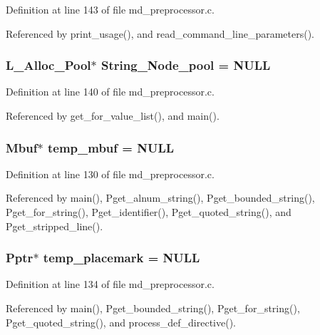 Definition at line 143 of file md\_\-preprocessor.c.

Referenced by print\_\-usage(), and read\_\-command\_\-line\_\-parameters().
\subsubsection{\setlength{\rightskip}{0pt plus 5cm}\bf{L\_\-Alloc\_\-Pool}$\ast$ \bf{String\_\-Node\_\-pool} = \bf{NULL}}\label{md__preprocessor_8c_d47ec2b1abf9cb9d0128bc3fc27d94c5}




Definition at line 140 of file md\_\-preprocessor.c.

Referenced by get\_\-for\_\-value\_\-list(), and main().
\subsubsection{\setlength{\rightskip}{0pt plus 5cm}\bf{Mbuf}$\ast$ \bf{temp\_\-mbuf} = \bf{NULL}}\label{md__preprocessor_8c_bcfb4b06283a7a8a72bf5c01c75b4e35}




Definition at line 130 of file md\_\-preprocessor.c.

Referenced by main(), Pget\_\-alnum\_\-string(), Pget\_\-bounded\_\-string(), Pget\_\-for\_\-string(), Pget\_\-identifier(), Pget\_\-quoted\_\-string(), and Pget\_\-stripped\_\-line().
\subsubsection{\setlength{\rightskip}{0pt plus 5cm}\bf{Pptr}$\ast$ \bf{temp\_\-placemark} = \bf{NULL}}\label{md__preprocessor_8c_bc1de95fe5c53717a01e4d0edca5f40a}




Definition at line 134 of file md\_\-preprocessor.c.

Referenced by main(), Pget\_\-bounded\_\-string(), Pget\_\-for\_\-string(), Pget\_\-quoted\_\-string(), and process\_\-def\_\-directive().

